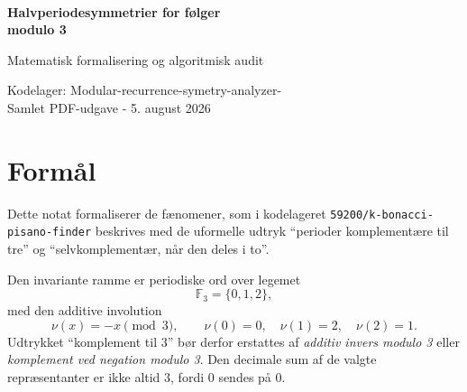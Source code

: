 \documentclass[11pt,a4paper]{article}
\newcommand{\F}{\mathbb{F}}
\begin{document}
\sloppy
\thispagestyle{empty}
\vspace*{20mm}
\noindent\noindent{\color{AccentBlue}\rule{\textwidth}{0.8pt}}\\[22mm]
{\raggedright\fontsize{24}{29}\selectfont\bfseries\color{TitleBlue}Halvperiodesymmetrier for følger\\ modulo 3\par}
\vspace{9mm}
{\fontsize{15}{20}\selectfont\color{AccentBlue}Matematisk formalisering og algoritmisk audit\par}
\vspace{17mm}
\noindent{}
\vfill
{\color{TitleBlue}\small
Kodelager: \textsf{Modular-recurrence-symetry-analyzer-}\\
Samlet PDF-udgave - 5. august 2026
}\par
\vspace{18mm}
\noindent{\color{AccentBlue}\rule{\textwidth}{0.8pt}}
\clearpage
\setcounter{page}{1}

\tableofcontents
\clearpage


\section{Formål}
Dette notat formaliserer de fænomener, som i kodelageret \nolinkurl{59200/k-bonacci-pisano-finder} beskrives med de uformelle udtryk ``perioder komplementære til tre'' og ``selvkomplementær, når den deles i to''.

Den invariante ramme er periodiske ord over legemet
\[
\F_3=\{0,1,2\},
\]
med den additive involution
\[
\nu(x)=-x\pmod 3,\qquad \nu(0)=0,\quad \nu(1)=2,\quad \nu(2)=1.
\]
Udtrykket ``komplement til 3'' bør derfor erstattes af \emph{additiv invers modulo 3} eller \emph{komplement ved negation modulo 3}. Den decimale sum af de valgte repræsentanter er ikke altid 3, fordi 0 sendes på 0.
\end{document}
